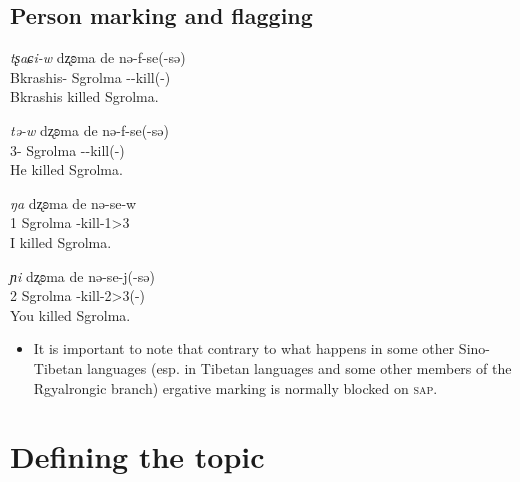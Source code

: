 \documentclass[11pt]{article}
\newcommand{\ipa}[1]{{\textit{\phon #1}}} %
\newcommand{\ipapl}[1]{{\phondroit #1}}
\begin{document}
\subsection{Person marking and flagging}

\begin{exe}
\ex \label{ex:np3}
\gll
	\ipa{tʂaɕi-w} \ipapl{dʐʚma} 	\ipapl{de} \ipapl{nə-f-se(-sə)} \\
	{Bkrashis-\erg} Sgrolma {\dem} {\prf-\inv-kill(-\evid)}\\ 
	\glt Bkrashis killed Sgrolma.
\end{exe}

\begin{exe}
\ex \label{ex:33}
\gll
	\ipa{tə-w} \ipapl{dʐʚma} \ipapl{de} \ipapl{nə-f-se(-sə)} \\
	{3\sg-\erg} Sgrolma {\dem} {\prf-\inv-kill(-\evid)}\\ 
	\glt He killed Sgrolma.
\end{exe}

\begin{exe}
\ex \label{ex:13}
\gll
	\ipa{ŋa}	\ipapl{dʐʚma} 	\ipapl{de} 	\ipapl{nə-se-w} \\
	{1\sg} Sgrolma {\dem} {\prf-kill-1\sg>3}\\ 
	\glt I killed Sgrolma.
\end{exe}

\begin{exe}
\ex \label{ex:23}
\gll
	\ipa{ɲi}	\ipapl{dʐʚma} 	\ipapl{de} 	\ipapl{nə-se-j(-sə)} \\
	{2\sg} Sgrolma {\dem} {\prf-kill-2\sg>3(-\evid)}\\ 
	\glt You killed Sgrolma.
\end{exe}




 
\begin{itemize}
 \item It is important to note that contrary to what happens in some other Sino-Tibetan languages (esp. in Tibetan languages and some other members of the Rgyalrongic branch) ergative marking is normally blocked on \textsc{sap}.%
\end{itemize}



\section{Defining the topic}
\end{document}
